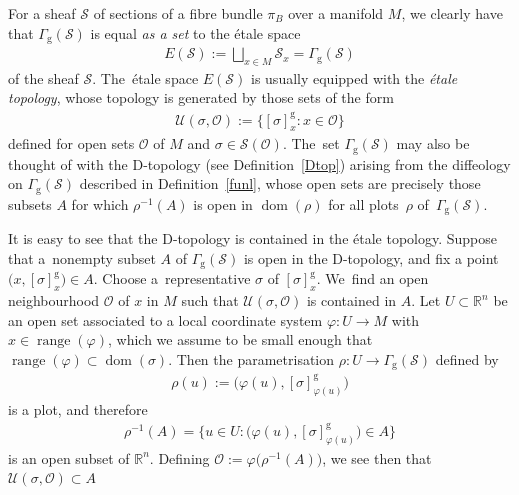 \documentclass[10pt,a4paper]{amsart}
\numberwithin{equation}{section}
\def\g{\operatorname{g}}
\def\dom{\operatorname{dom}}
\def\range{\operatorname{range}}
\def\UU{{\mathcal{U}}}
\def\OO{{\mathcal{O}}}
\def\SS{{\mathscr{S}}}
\def\RB{{\mathbb{R}}}
\begin{document}
\begin{Remark}\label{relsheaf4}
For a sheaf $\SS$ of sections of a fibre bundle $\pi_{B}$ over a manifold $M$, we clearly have that $\Gamma_{\g}(\SS)$ is equal \textit{as a set} to the \'{e}tale space~\cite[p.~67]{hartshorne}
\begin{gather*}
E(\SS):=\bigsqcup_{x\in M}\SS_{x} = \Gamma_{\g}(\SS)
\end{gather*}
of the sheaf $\SS$. The~\'{e}tale space $E(\SS)$ is usually equipped with the \textit{\'{e}tale topology}, whose topology is generated by those sets of the form
\begin{gather*}
\UU(\sigma,\OO):=\big\{[\sigma]^{\g}_{x}\colon x\in\OO\big\}
\end{gather*}
defined for open sets $\OO$ of $M$ and $\sigma\in\SS(\OO)$. The~set $\Gamma_{\g}(\SS)$ may also be thought of with the D-topology (see Definition~\ref{Dtop}) arising from the diffeology on $\Gamma_{\g}(\SS)$ described in Definition~\ref{funl}, whose open sets are precisely those subsets $A$ for which $\rho^{-1}(A)$ is open in $\dom(\rho)$ for all plots~$\rho$ of~$\Gamma_{\g}(\SS)$.

It is easy to see that the D-topology is contained in the \'{e}tale topology. Suppose that a~non\-empty subset $A$ of $\Gamma_{\g}(\SS)$ is open in the D-topology, and fix a point $\big(x,[\sigma]_{x}^{\g}\big)\in A$. Choose a~representative $\sigma$ of $[\sigma]_{x}^{\g}$. We~find an open neighbourhood $\OO$ of $x$ in $M$ such that $\UU(\sigma,\OO)$ is contained in $A$. Let $U\subset\RB^{n}$ be an open set associated to a local coordinate system $\varphi\colon U\rightarrow M$ with $x\in\range(\varphi)$, which we assume to be small enough that $\range(\varphi)\subset\dom(\sigma)$. Then the parametrisation $\rho\colon U\rightarrow\Gamma_{\g}(\SS)$ defined by
\begin{gather*}
\rho(u):=\big(\varphi(u),[\sigma]^{\g}_{\varphi(u)}\big)
\end{gather*}
is a plot, and therefore
\begin{gather*}
\rho^{-1}(A) = \big\{u\in U\colon \big(\varphi(u),[\sigma]^{\g}_{\varphi(u)}\big)\in A\big\}
\end{gather*}
is an open subset of $\RB^{n}$. Defining $\OO:=\varphi\big(\rho^{-1}(A)\big)$, we see then that $\UU(\sigma,\OO)\subset A$


\end{Remark}
\end{document}
